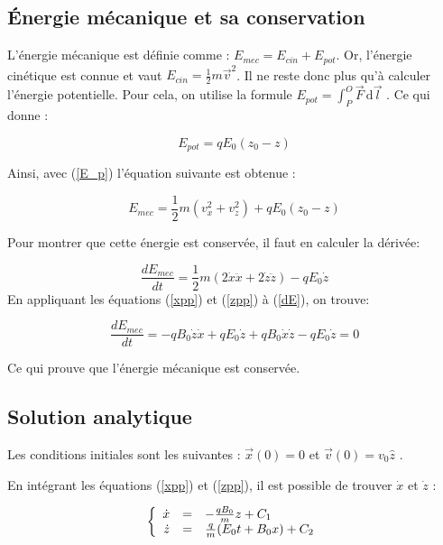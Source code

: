 \documentclass[a4paper,12pt,twoside]{article}
\begin{document}
	\subsection{\'Energie m\'ecanique et sa conservation}
	
		\noindent L'\'energie m\'ecanique est d\'efinie comme : $E_{mec} = E_{cin} + E_{pot}$. Or, l'\'energie cin\'etique est connue et vaut $E_{cin} = \frac{1}{2} m {\vec{v}}^2$.
		Il ne reste donc plus qu'\`a calculer l'\'energie potentielle. Pour cela, on utilise la formule $E_{pot} = \int_P^O \vec{F}\, \mathrm d\vec{l}$ \cite{FT}. Ce qui donne :
	
			\begin{equation}\label{E_p}
				E_{pot} = qE_0 (z_0-z)
			\end{equation}
		
		\noindent Ainsi, avec (\ref{E_p}) l'\'equation suivante est obtenue :
	
			\begin{equation}
				E_{mec} = \frac{1}{2}m(v_x^2+v_z^2) + qE_0(z_0 - z)
			\end{equation}
		
		\noindent Pour montrer que cette \'energie est conserv\'ee, il faut en calculer la d\'eriv\'ee:
	
			\begin{equation} \label{dE}
				\frac{dE_{mec}}{dt} = \frac{1}{2} m(2\dot{x}\ddot{x} + 2\dot{z}\ddot{z}) - 	qE_0\dot{z} 
			\end{equation}
		En appliquant les équations (\ref{xpp}) et (\ref{zpp}) \`a (\ref{dE}), on trouve:
	
			\begin{equation}
				\frac{dE_{mec}}{dt}= -qB_0\dot{z}\dot{x}+qE_0\dot{z}+qB_0\dot{x}\dot{z}-qE_0\dot{z} = 0
			\end{equation}
	
		\noindent Ce qui prouve que l'\'energie m\'ecanique est conserv\'ee.
	
	\subsection{Solution analytique}
	
		\noindent Les conditions initiales sont les suivantes : $\vec{x}(0) = 0$ et $ \vec{v}(0) = v_0\hat{z}$ \cite{Notes}.
		
		\noindent En int\'egrant les \'equations (\ref{xpp}) et (\ref{zpp}), il est possible de trouver $\dot{x}$ et $\dot{z}$ :
		
			\begin{equation}\label{aa}
				\left \{
				\begin{array}{r c l}
					\dot{x} & = & -\frac{qB_0}{m}z + C_1  \\
					\dot{z} & = & \frac{q}{m} (E_0t + B_0x) + C_2\\
				\end{array}
				\right .
			\end{equation}
		
\end{document}
